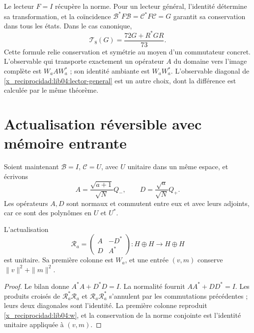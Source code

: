 Le lecteur \(F=I\) récupère la norme. Pour un lecteur général,
l’identité détermine sa transformation, et la coïncidence
\(\mathcal B^*F\mathcal B=\mathcal C^*F\mathcal C=G\) garantit
sa conservation dans tous les états. Dans le cas canonique,
\begin{equation}
 \mathcal T_8(G)=\frac{72G+R^*GR}{73}.
 \label{x_reciprocidad:lib04:lector-72}
\end{equation}
Cette formule relie conservation et symétrie au moyen d’un commutateur
concret. L’observable qui transporte exactement un opérateur
\(A\) du domaine vers l’image complète est \(W_aAW_a^*\) ; son
identité ambiante est \(W_aW_a^*\). L’observable diagonal de
\eqref{x_reciprocidad:lib04:lector-general} est un autre choix, dont la différence est
calculée par le même théorème.

\section{Actualisation réversible avec mémoire entrante}
\label{x_reciprocidad:lib04:reentrada}

Soient maintenant \(\mathcal B=I\), \(\mathcal C=U\), avec \(U\)
unitaire dans un même espace, et écrivons
\begin{equation}
 A=\frac{\sqrt{a+1}}{\sqrt N}Q_-,\qquad
 D=\frac{\sqrt a}{\sqrt N}Q_+.
 \label{x_reciprocidad:lib04:ad}
\end{equation}
Les opérateurs \(A,D\) sont normaux et commutent entre eux et avec leurs adjoints, car ce sont des polynômes en \(U\) et \(U^*\).

\begin{theorem}
\label{x_reciprocidad:lib04:teo-unitaria}
L’actualisation
\begin{equation}
 \mathscr R_a=
 \begin{pmatrix}A&-D^*\\D&A^*\end{pmatrix}:H\oplus H\to H\oplus H
 \label{x_reciprocidad:lib04:unitaria}
\end{equation}
est unitaire. Sa première colonne est \(W_a\), et une entrée
\((v,m)\) conserve \(\|v\|^2+\|m\|^2\).
\end{theorem}

\begin{proof}
Le bilan donne \(A^*A+D^*D=I\). La normalité fournit
\(AA^*+DD^*=I\). Les produits croisés de
\(\mathscr R_a^*\mathscr R_a\) et
\(\mathscr R_a\mathscr R_a^*\) s’annulent par les commutations
précédentes ; leurs deux diagonales sont l’identité. La première colonne
reproduit \eqref{x_reciprocidad:lib04:w}, et la conservation de la norme conjointe
est l’identité unitaire appliquée à \((v,m)\).
\end{proof}

